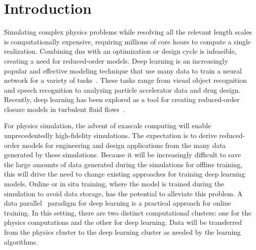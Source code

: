 \documentclass[review]{elsarticle}
\begin{document}
\glsresetall

\section{Introduction}\label{sec:intro}

Simulating complex physics problems while resolving all the relevant
length scales is computationally expensive, requiring millions of core
hours to compute a single realization. Combining \gls{dns} with an
optimization or design cycle is infeasible, creating a need for
reduced-order models. Deep learning is an increasingly popular and
effective modeling technique that use many data to train a neural
network for a variety of tasks~\cite{Lecun2015, Schmidhuber2015,
  Prieto2016, Goodfellow2016, Liu2017}. These tasks range from visual
object recognition and speech recognition to analyzing particle
accelerator data and drug design. Recently, deep learning has been
explored as a tool for creating reduced-order closure models in
turbulent fluid flows~\cite{ling2016reynolds, duraisamy2015new,
  duraisamy2019turbulence}.

For physics simulation, the advent of exascale computing will enable
unprecedentedly high-fidelity simulations. The expectation is to
derive reduced-order models for engineering and design applications
from the many data generated by these simulations. Because it will be
increasingly difficult to save the large amounts of data generated
during the simulations for offline training, this will drive the need
to change existing approaches for training deep learning
models. Online or in situ training, where the model is trained during
the simulation to avoid data storage, has the potential to alleviate
this problem. A data parallel~\cite{zinkevich2010parallelized}
paradigm for deep learning is a practical approach for online
training. In this setting, there are two distinct computational
clusters: one for the physics computations and the other for deep
learning. Data will be transferred from the physics cluster to the
deep learning cluster as needed by the learning algorithms.
\end{document}
